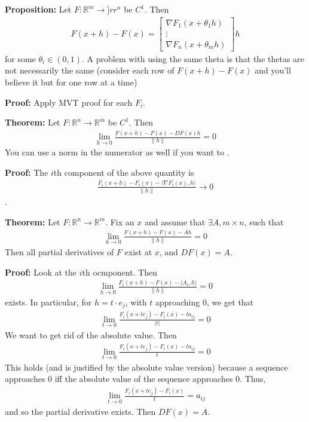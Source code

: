 \documentclass{article}
\newcommand*{\iprod}[1]{\langle #1 \rangle}
\newcommand*{\rr}{\mathbb{R}}%
\begin{document}
\textbf{Proposition:} Let $F:\rr^m\to ]rr^n$ be $C^1$. Then \begin{align*}
    F(x+h)-F(x)=\begin{bmatrix}
        \nabla F_1(x+\theta_1 h)\\
        \vdots\\
        \nabla F_n(x+\theta_m h)
    \end{bmatrix}h
\end{align*} for some $\theta_i\in (0,1)$. A problem with using the same theta is that the thetas are not necessarily the same (consider each row of $F(x+h)-F(x)$ and you'll believe it but for one row at a time)

\textbf{Proof:} Apply MVT proof for each $F_i$.

\textbf{Theorem:} Let $F:\rr^n\to \rr^m$ be $C^1$. Then \begin{align*}
    \lim_{h\to 0}\frac{F(x+h)-F(x)-DF(x)h}{\|h\|}=0
\end{align*} You can use a norm in the numerator as well if you want to .

\textbf{Proof:} The $i$th component of the above quantity is \begin{align*}
    \frac{F_i(x+h)-F_i(x)-\iprod{\nabla F_i(x),h}}{\|h\|}\to 0
\end{align*}. 

\textbf{Theorem:} Let $F:\rr^n\to \rr^m$. Fix an $x$ and assume that $\exists A,m\times n$, such that \begin{align*}
    \lim_{h\to 0}\frac{F(x+h)-F(x)-Ah}{\|h\|}=0
\end{align*} Then all partial derivatives of $F$ exist at $x$, and $DF(x)=A$.

\textbf{Proof:} Look at the $i$th ocmponent. Then \begin{align*}
    \lim_{h\to 0}\frac{F_i(x+h)-F(x)-\iprod{A_i,h}}{\|h\|}=0
\end{align*} exists. In particular, for $h=t\cdot e_j$, with $t$ approaching 0, we get that \begin{align*}
    \lim_{t\to 0} \frac{F_i(x+te_j)-F_i(x)-ta_{ij}}{|t|}=0
\end{align*} We want to get rid of the absolute value. Then \begin{align*}
    \lim_{t\to 0} \frac{F_i(x+te_j)-F_i(x)-ta_{ij}}{t}=0
\end{align*} This holds (and is justified by the absolute value version) because a sequence approaches 0 iff the absolute value of the sequence approaches 0. Thus, \begin{align*}
    \lim_{t\to 0} \frac{F_i(x+te_j)-F_i(x)}{t}=a_{ij}
\end{align*} and so the partial derivative exists. Then $DF(x)=A$.
\end{document}

